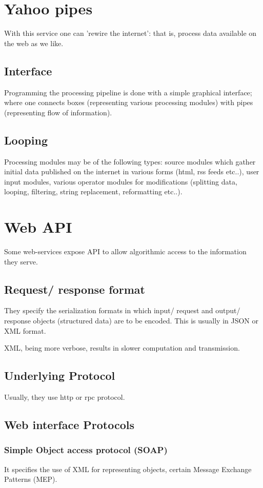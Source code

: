 \documentclass[oneside, article]{memoir}
\begin{document}
\chapter{Yahoo pipes}
With this service one can 'rewire the internet': that is, process data available on the web as we like.

\section{Interface}
Programming the processing pipeline is done with a simple graphical interface; where one connects boxes (representing various processing modules) with pipes (representing flow of information).

\section{Looping}
Processing modules may be of the following types: source modules which gather initial data published on the internet in various forms (html, rss feeds etc..),  user input modules, various operator modules for modifications (splitting data, looping, filtering, string replacement, reformatting etc..).

\chapter{Web API}
Some web-services expose API to allow algorithmic access to the information they serve.

\section{Request/ response format}
They specify the serialization formats in which input/ request and output/ response objects (structured data) are to be encoded. This is usually in JSON or XML format.

XML, being more verbose, results in slower computation and transmission.

\section{Underlying Protocol}
Usually, they use http or rpc protocol.

\section{Web interface Protocols}
\subsection{Simple Object access protocol (SOAP)}
It specifies the use of XML for representing objects, certain Message Exchange Patterns (MEP).
\end{document}
